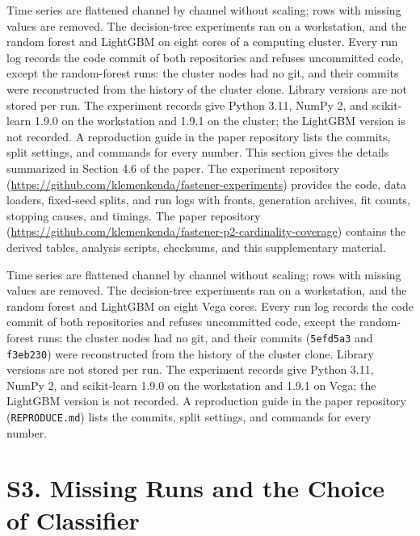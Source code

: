 \documentclass[10pt]{article}
\begin{document}
Time series are flattened channel by channel without scaling; rows with missing values are removed. The decision-tree experiments ran on a workstation, and the random forest and LightGBM on eight cores of a computing cluster. Every run log records the code commit of both repositories and refuses uncommitted code, except the random-forest runs: the cluster nodes had no git, and their commits were reconstructed from the history of the cluster clone. Library versions are not stored per run. The experiment records give Python 3.11, NumPy 2, and scikit-learn 1.9.0 on the workstation and 1.9.1 on the cluster; the LightGBM version is not recorded. A reproduction guide in the paper repository lists the commits, split settings, and commands for every number.
\else
This section gives the details summarized in Section 4.6 of the paper. The experiment repository (\url{https://github.com/klemenkenda/fastener-experiments}) provides the code, data loaders, fixed-seed splits, and run logs with fronts, generation archives, fit counts, stopping causes, and timings. The paper repository (\url{https://github.com/klemenkenda/fastener-p2-cardinality-coverage}) contains the derived tables, analysis scripts, checksums, and this supplementary material.

Time series are flattened channel by channel without scaling; rows with missing values are removed. The decision-tree experiments ran on a workstation, and the random forest and LightGBM on eight Vega cores. Every run log records the code commit of both repositories and refuses uncommitted code, except the random-forest runs: the cluster nodes had no git, and their commits (\texttt{5efd5a3} and \texttt{f3eb230}) were reconstructed from the history of the cluster clone. Library versions are not stored per run. The experiment records give Python 3.11, NumPy 2, and scikit-learn 1.9.0 on the workstation and 1.9.1 on Vega; the LightGBM version is not recorded. A reproduction guide in the paper repository (\texttt{REPRODUCE.md}) lists the commits, split settings, and commands for every number.
\fi

\clearpage
\section*{S3. Missing Runs and the Choice of Classifier}
\end{document}

